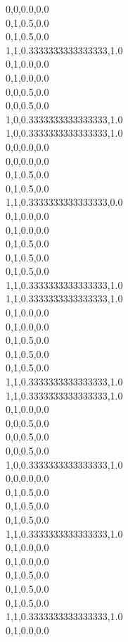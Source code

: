 0,0,0.0,0.0\\
0,1,0.5,0.0\\
0,1,0.5,0.0\\
1,1,0.3333333333333333,1.0\\
0,1,0.0,0.0\\
0,1,0.0,0.0\\
0,0,0.5,0.0\\
0,0,0.5,0.0\\
1,0,0.3333333333333333,1.0\\
1,0,0.3333333333333333,1.0\\
0,0,0.0,0.0\\
0,0,0.0,0.0\\
0,1,0.5,0.0\\
0,1,0.5,0.0\\
1,1,0.3333333333333333,0.0\\
0,1,0.0,0.0\\
0,1,0.0,0.0\\
0,1,0.5,0.0\\
0,1,0.5,0.0\\
0,1,0.5,0.0\\
1,1,0.3333333333333333,1.0\\
1,1,0.3333333333333333,1.0\\
0,1,0.0,0.0\\
0,1,0.0,0.0\\
0,1,0.5,0.0\\
0,1,0.5,0.0\\
0,1,0.5,0.0\\
1,1,0.3333333333333333,1.0\\
1,1,0.3333333333333333,1.0\\
0,1,0.0,0.0\\
0,0,0.5,0.0\\
0,0,0.5,0.0\\
0,0,0.5,0.0\\
1,0,0.3333333333333333,1.0\\
0,0,0.0,0.0\\
0,1,0.5,0.0\\
0,1,0.5,0.0\\
0,1,0.5,0.0\\
1,1,0.3333333333333333,1.0\\
0,1,0.0,0.0\\
0,1,0.0,0.0\\
0,1,0.5,0.0\\
0,1,0.5,0.0\\
0,1,0.5,0.0\\
1,1,0.3333333333333333,1.0\\
0,1,0.0,0.0\\
